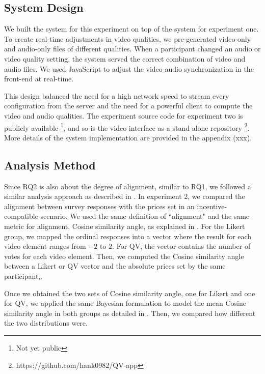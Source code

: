 \subsection{System Design}
We built the system for this experiment on top of the system for experiment one. To create real-time adjustments in video qualities, we pre-generated video-only and audio-only files of different qualities. When a participant changed an audio or video quality setting, the system served the correct combination of video and audio files. We used JavaScript to adjust the video-audio synchronization in the front-end at real-time.

This design balanced the need for a high network speed to stream every configuration from the server and the need for a powerful client to compute the video and audio qualities. The experiment source code for experiment two is publicly available \footnote{Not yet public}, and so is the video interface as a stand-alone repository \footnote{https://github.com/hank0982/QV-app}. More details of the system implementation are provided in the appendix (xxx).

\subsection{Analysis Method}

Since RQ2 is also about the degree of alignment, similar to RQ1, we followed a similar analysis approach as described in . In experiment 2, we compared the alignment between survey responses with the prices set in an incentive-compatible scenario. We used the same definition of ``alignment" and the same metric for alignment, Cosine similarity angle, as explained in . For the Likert group, we mapped the ordinal responses into a vector where the result for each video element ranges from $-2$ to $2$. For QV, the vector contains the number of votes for each video element. Then, we computed the Cosine similarity angle between a Likert or QV vector and the absolute prices set by the same participant,.

Once we obtained the two sets of Cosine similarity angle, one for Likert and one for QV, we applied the same Bayesian formulation to model the mean Cosine similarity angle in both groups as detailed in . Then, we compared how different the two distributions were.
